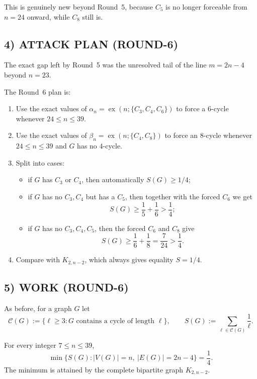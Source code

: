 This is genuinely new beyond Round~5, because $C_5$ is no longer forceable from $n=24$ onward, while $C_8$ still is.

\subsection*{4) ATTACK PLAN (ROUND-6)}

The exact gap left by Round~5 was the unresolved tail of the line $m=2n-4$ beyond $n=23$.

The Round~6 plan is:
\begin{enumerate}
\item Use the exact values of $\alpha_n=\operatorname{ex}(n;\{C_3,C_4,C_6\})$ to force a $6$-cycle whenever $24\le n\le 39$.
\item Use the exact values of $\beta_n=\operatorname{ex}(n;\{C_4,C_8\})$ to force an $8$-cycle whenever $24\le n\le 39$ and $G$ has no $4$-cycle.
\item Split into cases:
  \begin{itemize}
  \item if $G$ has $C_3$ or $C_4$, then automatically $S(G)\ge 1/4$;
  \item if $G$ has no $C_3,C_4$ but has a $C_5$, then together with the forced $C_6$ we get
  \[
  S(G)\ge \frac15+\frac16>\frac14;
  \]
  \item if $G$ has no $C_3,C_4,C_5$, then the forced $C_6$ and $C_8$ give
  \[
  S(G)\ge \frac16+\frac18=\frac7{24}>\frac14.
  \]
  \end{itemize}
\item Compare with $K_{2,n-2}$, which always gives equality $S=1/4$.
\end{enumerate}

\subsection*{5) WORK (ROUND-6)}

As before, for a graph $G$ let
\[
\mathcal C(G):=\{\ell\ge 3 : \text{$G$ contains a cycle of length $\ell$}\},
\qquad
S(G):=\sum_{\ell\in\mathcal C(G)}\frac1\ell.
\]

\begin{theorem}[Extension of the $K_{2,n-2}$ line through $n=39$]\label{thm:round6-main}
For every integer $7\le n\le 39$,
\[
\min\{S(G): |V(G)|=n,\ |E(G)|=2n-4\}=\frac14.
\]
The minimum is attained by the complete bipartite graph $K_{2,n-2}$.
\end{theorem}

